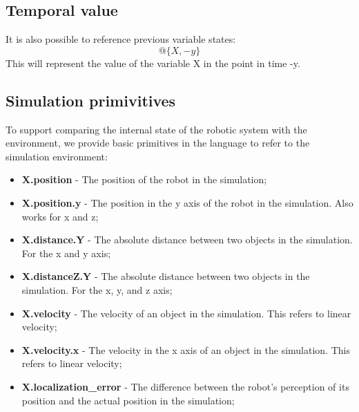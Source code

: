 
\subsection{Temporal value}

It is also possible to reference previous variable states:
\begin{equation}
@\{X, -y\}
\end{equation}
This will represent the value of the variable X in the point in time -y.

\subsection{Simulation primivitives}

To support comparing the internal state of the robotic system with the environment, we provide basic primitives in the language to refer to the simulation environment:

\begin{itemize}
\item {\bfseries X.position} - The position of the robot in the simulation;
\item {\bfseries X.position.y} - The position in the y axis of the robot in the simulation. Also works for x and z;
\item {\bfseries X.distance.Y} - The absolute distance between two objects in the simulation. For the x and y axis;
\item {\bfseries X.distanceZ.Y} - The absolute distance between two objects in the simulation. For the x, y, and z axis;
\item {\bfseries X.velocity} - The velocity of an object in the simulation. This refers to linear velocity;
\item {\bfseries X.velocity.x} - The velocity in the x axis of an object in the simulation. This refers to linear velocity;
\item {\bfseries X.localization\_error} - The difference between the robot's perception of its position and the actual position in the simulation;
\end{itemize}

